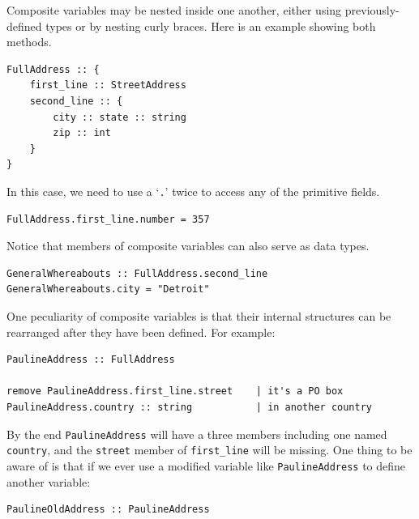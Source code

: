 \documentclass{article}
\newenvironment{code}{
       \begin{list}{}{
               \setlength{\leftmargin}{.4in}
               \setlength{\rightmargin}{0in}
               \setlength{\topsep}{.2in}
       }
       \small
       \item[] }
       { \end{list}   }
\begin{document}
Composite variables may be nested inside one another, either using previously-defined types or by nesting curly braces.  Here is an example showing both methods.

\begin{code} \begin{verbatim}
FullAddress :: {
    first_line :: StreetAddress
    second_line :: {
        city :: state :: string
        zip :: int
    }
}
\end{verbatim} \end{code}

\noindent In this case, we need to use a `\texttt{.}' twice to access any of the primitive fields.

\begin{code} \begin{verbatim}
FullAddress.first_line.number = 357
\end{verbatim} \end{code}

\noindent Notice that members of composite variables can also serve as data types.

\begin{code} \begin{verbatim}
GeneralWhereabouts :: FullAddress.second_line
GeneralWhereabouts.city = "Detroit"
\end{verbatim} \end{code}

One peculiarity of composite variables is that their internal structures can be rearranged after they have been defined.  For example:

\begin{code} \begin{verbatim}
PaulineAddress :: FullAddress

remove PaulineAddress.first_line.street    | it's a PO box
PaulineAddress.country :: string           | in another country
\end{verbatim} \end{code}

\noindent By the end \texttt{PaulineAddress} will have a three members including one named \verb#country#, and the \texttt{street} member of \verb#first_line# will be missing.  One thing to be aware of is that if we ever use a modified variable like \verb#PaulineAddress# to define another variable:

\begin{code} \begin{verbatim}
PaulineOldAddress :: PaulineAddress
\end{verbatim} \end{code}
\end{document}
